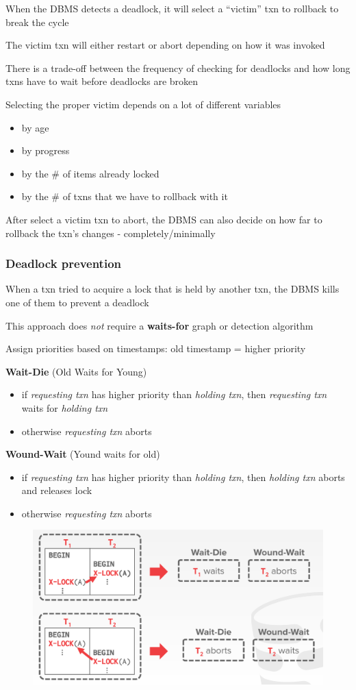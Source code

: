 \documentclass[11pt]{article}
\begin{document}
When the DBMS detects a deadlock, it will select a ``victim'' txn to rollback to break the cycle

The victim txn will either restart or abort depending on how it was invoked

There is a trade-off between the frequency of checking for deadlocks and how long txns have to
wait before deadlocks are broken

Selecting the proper victim depends on a lot of different variables
\begin{itemize}
\item by age
\item by progress
\item by the \# of items already locked
\item by the \# of txns that we have to rollback with it
\end{itemize}

After select a victim txn to abort, the DBMS can also decide on how far to rollback the txn's
changes - completely/minimally
\subsubsection{Deadlock prevention}
\label{sec:org5158b5b}
When a txn tried to acquire a lock that is held by another txn, the DBMS kills one of them to
prevent a deadlock

This approach does \emph{not} require a \textbf{waits-for} graph or detection algorithm

Assign priorities based on timestamps: old timestamp = higher priority

\textbf{Wait-Die} (Old Waits for Young)
\begin{itemize}
\item if \emph{requesting txn} has higher priority than \emph{holding txn}, then \emph{requesting txn} waits for \emph{holding
txn}
\item otherwise \emph{requesting txn} aborts
\end{itemize}
\textbf{Wound-Wait} (Yound waits for old)
\begin{itemize}
\item if \emph{requesting txn} has higher priority than \emph{holding txn}, then \emph{holding txn} aborts and releases lock
\item otherwise \emph{requesting txn} aborts
\end{itemize}

\begin{figure}[htbp]
\centering
\includegraphics[width=.8\textwidth]{../images/15445/62.png}
\label{}
\end{figure}
\end{document}
